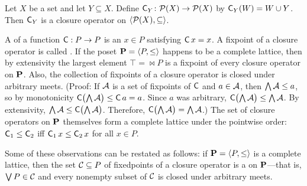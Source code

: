 \begin{example}
Let $X$ be a set and let $Y \subseteq X$.
Define $\operatorname{\mathsf{C}}_Y\colon \mathcal{P}(X) \to \mathcal{P}(X)$ by $\operatorname{\mathsf{C}}_Y (W) = W \cup Y$.
Then $\operatorname{\mathsf{C}}_Y$ is a closure operator on $\langle\mathcal{P}(X), \subseteq\rangle$.
\end{example}


A  of a
function $\operatorname{\mathsf{C}} : P \to P$ is an $x\in P$ satisfying $\operatorname{\mathsf{C}} x = x$.
A fixpoint of a closure operator is called .
If the poset $\mathbf{P} = \langle P, \leq\rangle$ happens to be a complete lattice,
then by extensivity the largest element $\top = \Join P$ is
a fixpoint of every closure operator on $\mathbf{P}$.
Also, the collection of fixpoints of a closure operator is closed under arbitrary meets.
(Proof: If $\mathcal{A}$ is a set of fixpoints of $\operatorname{\mathsf{C}}$ and  
$a \in \mathcal{A}$, then $\bigwedge \mathcal{A} \leq a$, so by monotonicity
$\operatorname{\mathsf{C}} \bigl( \bigwedge \mathcal{A} \bigr) \leq \operatorname{\mathsf{C}} a = a$. 
Since $a$ was arbitrary,
$\operatorname{\mathsf{C}} \bigl( \bigwedge \mathcal{A} \bigr) \leq  \bigwedge \mathcal{A}$.
By extensivity,
$\bigwedge \mathcal{A} \leq \operatorname{\mathsf{C}} \bigl( \bigwedge \mathcal{A}\bigr)$. %
Therefore, $\operatorname{\mathsf{C}} \bigl( \bigwedge \mathcal{A} \bigr) =  \bigwedge \mathcal{A}$.)
The set of closure operators on $\mathbf{P}$ themselves form a complete lattice under the pointwise
order: $\operatorname{\mathsf{C}}_1 \leq  \operatorname{\mathsf{C}}_2$ iff $\operatorname{\mathsf{C}}_1 x \leq  \operatorname{\mathsf{C}}_2 x$ for all $x \in P$. 

Some of these observations can be restated as follows:
if $\mathbf{P} = \langle P, \leq\rangle$ is a complete lattice,
then the set $\mathcal{C} \subseteq P$ of fixedpoints of a closure operator
is a  on $\mathbf{P}$---that is, 
$\bigvee P \in \mathcal{C}$ and every nonempty subset of $\mathcal{C}$ is closed under arbitrary meets.


